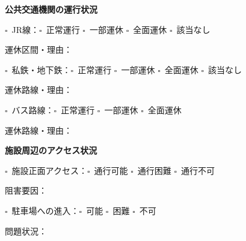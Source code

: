 \documentclass[a4paper,12pt]{jarticle}
\newcommand{\checkbox}{$\square$\ }
\newcommand{\underlinespace}[1]{\underline{\hspace{#1}}}
\begin{document}
\begin{center}
\textbf{\large 公共交通機関の運行状況}
\end{center}

\vspace{3mm}

\noindent
\checkbox JR線：\checkbox 正常運行 \quad \checkbox 一部運休 \quad \checkbox 全面運休 \quad \checkbox 該当なし

\vspace{2mm}

\noindent
運休区間・理由：\underlinespace{10cm}

\vspace{3mm}

\noindent
\checkbox 私鉄・地下鉄：\checkbox 正常運行 \quad \checkbox 一部運休 \quad \checkbox 全面運休 \quad \checkbox 該当なし

\vspace{2mm}

\noindent
運休路線・理由：\underlinespace{10cm}

\vspace{3mm}

\noindent
\checkbox バス路線：\checkbox 正常運行 \quad \checkbox 一部運休 \quad \checkbox 全面運休

\vspace{2mm}

\noindent
運休路線・理由：\underlinespace{10cm}

\vspace{8mm}

\begin{center}
\textbf{\large 施設周辺のアクセス状況}
\end{center}

\vspace{3mm}

\noindent
\checkbox 施設正面アクセス：\checkbox 通行可能 \quad \checkbox 通行困難 \quad \checkbox 通行不可

\vspace{2mm}

\noindent
阻害要因：\underlinespace{10cm}

\vspace{3mm}

\noindent
\checkbox 駐車場への進入：\checkbox 可能 \quad \checkbox 困難 \quad \checkbox 不可

\vspace{2mm}

\noindent
問題状況：\underlinespace{10cm}
\end{document}
